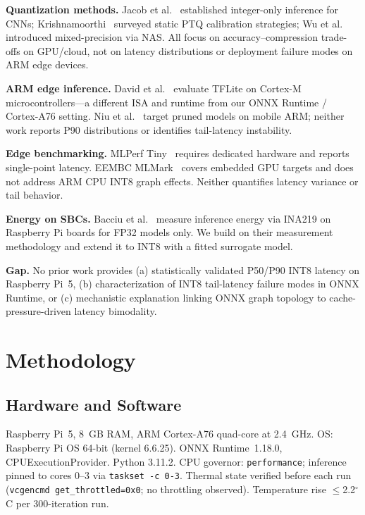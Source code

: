 \documentclass[journal]{IEEEtran}
\begin{document}
\textbf{Quantization methods.} Jacob et al.~\cite{jacob2018quantization} established integer-only inference for CNNs; Krishnamoorthi~\cite{krishnamoorthi2018quantizing} surveyed static PTQ calibration strategies; Wu et al.~\cite{wu2020mixed} introduced mixed-precision via NAS. All focus on accuracy--compression trade-offs on GPU/cloud, not on latency distributions or deployment failure modes on ARM edge devices.

\textbf{ARM edge inference.} David et al.~\cite{david2021tensorflow} evaluate TFLite on Cortex-M microcontrollers—a different ISA and runtime from our ONNX Runtime / Cortex-A76 setting. Niu et al.~\cite{niu2020patdnn} target pruned models on mobile ARM; neither work reports P90 distributions or identifies tail-latency instability.

\textbf{Edge benchmarking.} MLPerf Tiny~\cite{banbury2021mlperf} requires dedicated hardware and reports single-point latency. EEMBC MLMark~\cite{eembc2023mlmark} covers embedded GPU targets and does not address ARM CPU INT8 graph effects. Neither quantifies latency variance or tail behavior.

\textbf{Energy on SBCs.} Bacciu et al.~\cite{bacciu2021experimental} measure inference energy via INA219 on Raspberry Pi boards for FP32 models only. We build on their measurement methodology and extend it to INT8 with a fitted surrogate model.

\textbf{Gap.} No prior work provides (a) statistically validated P50/P90 INT8 latency on Raspberry Pi~5, (b) characterization of INT8 tail-latency failure modes in ONNX Runtime, or (c) mechanistic explanation linking ONNX graph topology to cache-pressure-driven latency bimodality.

\section{Methodology}

\subsection{Hardware and Software}
Raspberry Pi~5, 8~GB RAM, ARM Cortex-A76 quad-core at 2.4~GHz. OS: Raspberry Pi OS 64-bit (kernel 6.6.25). ONNX Runtime~1.18.0, CPUExecutionProvider. Python 3.11.2. CPU governor: \texttt{performance}; inference pinned to cores 0--3 via \texttt{taskset -c 0-3}. Thermal state verified before each run (\texttt{vcgencmd get\_throttled=0x0}; no throttling observed). Temperature rise $\leq$2.2$^\circ$C per 300-iteration run.
\end{document}
